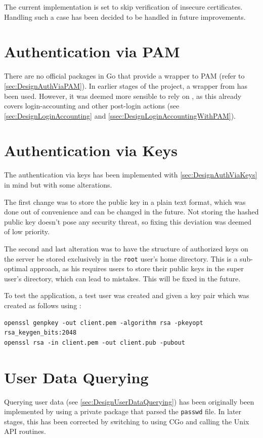\documentclass[10pt,a4paper,titlepage,twoside,english,final]{zhawreprt}
\begin{document}
The current implementation is set to skip verification of insecure certificates.
Handling such a case has been decided to be handled in future improvements.

\section{Authentication via PAM}\label{sec:ImplAuthViaPAM}
There are no official packages in \gls{Go} that provide a wrapper to \gls{PAM} (refer to \ref{sec:DesignAuthViaPAM}).
In earlier stages of the project, a wrapper from \cite{gopam} has been used.
However, it was deemed more sensible to rely on \cite{login}, as this already covers \gls{login}-accounting and other post-\gls{login} actions (see \ref{sec:DesignLoginAccounting} and \ref{ssec:DesignLoginAccountingWithPAM}).

\section{Authentication via Keys}\label{sec:ImplAuthViaKeys}
The authentication via keys has been implemented with \ref{sec:DesignAuthViaKeys} in mind but with some alterations.

The first change was to store the public key in a plain text format, which was done out of convenience and can be changed in the future.
Not storing the hashed public key doesn't pose any security threat, so fixing this deviation was deemed of low priority.

The second and last alteration was to have the structure of authorized keys on the server be stored exclusively in the \texttt{root} user's home directory.
This is a sub-optimal approach, as his requires users to store their public keys in the super user's directory, which can lead to mistakes.
This will be fixed in the future.

To test the application, a test user was created and given a key pair which was created as follows using \cite{openssl}:
\setlistingBash
\begin{lstlisting}[caption={Generating a key pair for the client},label=lst:GenClientKeyPair,deletekeywords={in}]
openssl genpkey -out client.pem -algorithm rsa -pkeyopt rsa_keygen_bits:2048
openssl rsa -in client.pem -out client.pub -pubout
\end{lstlisting}

\section{User Data Querying}\label{sec:ImplUserDataQuerying}
Querying user data (see \ref{sec:DesignUserDataQuerying}) has been originally been implemented by using a private package that parsed the \texttt{passwd} file.
In later stages, this has been corrected by switching to using \gls{CGo} and calling the \gls{Unix} \gls{API} routines.
\end{document}
